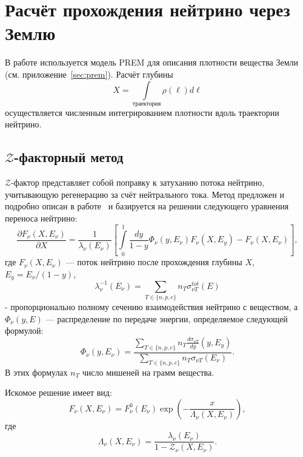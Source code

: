\section{Расчёт прохождения нейтрино через Землю}
\label{sec:zfactor}
В работе используется модель PREM для описания плотности вещества Земли (см. приложение~\ref{sec:prem}). Расчёт глубины 
\[
X=\int\limits_\text{траектория}\rho(\ell) d\ell
\]
осуществляется численным интегрированием плотности вдоль траектории нейтрино.

\subsection{$\mathcal{Z}$-факторный метод}

$\mathcal{Z}$-фактор представляет собой поправку к затуханию потока нейтрино, учитывающую регенерацию за счёт нейтрального тока. Метод предложен и подробно описан в работе~\cite{naumov1999} и базируется на решении следующего уравнения переноса нейтрино:
\begin{equation}
\frac{\partial F_{\nu}(X,E_\nu)}{\partial X} = \frac{1}{\lambda_{\nu}(E_\nu)}\left[ \int\limits_0^1\frac{dy}{1-y}\Phi_{\nu}(y,E_\nu) F_{\nu}(X,E_y) - F_{\nu}(X,E_\nu) \right],
\end{equation}
где $F_{\nu}(X,E_\nu)$ — поток нейтрино после прохождения глубины $X$, $E_y = E_\nu/(1-y)$, 
\[
\lambda^{-1}_{\nu}(E_\nu) = \sum\limits_{T\in \{n,p,e\}}n_T\sigma_{\nu T}^{tot}(E)
\] 
- пропорционально полному сечению взаимодействия нейтрино с веществом, а $\Phi_{\nu}(y,E)$ — распределение по передаче энергии, определяемое следующей формулой:
\begin{equation}
    \Phi_{\nu}(y,E_\nu) = \frac{\sum\limits_{T\in \{n,p,e\}}n_T\frac{d\sigma_{\nu T}}{dy}(y,E_y)}{\sum\limits_{T\in \{n,p,e\}}n_T\sigma_{\nu T}(E_\nu)}.
\end{equation}
В этих формулах $n_T$ число мишеней на грамм вещества.

Искомое решение имеет вид:
\begin{equation}
F_{\nu}(X,E_\nu) = F^{0}_{\nu}(E_\nu)\exp\left(-\frac{x}{\Lambda_{\nu}(X,E_\nu)}\right),
\end{equation}
где 
\begin{equation}
\Lambda_{\nu}(X,E_\nu) = \frac{\lambda_{\nu}(E_\nu)}{1 - \mathcal{Z}_{\nu}(X,E_\nu)}.
\end{equation}

